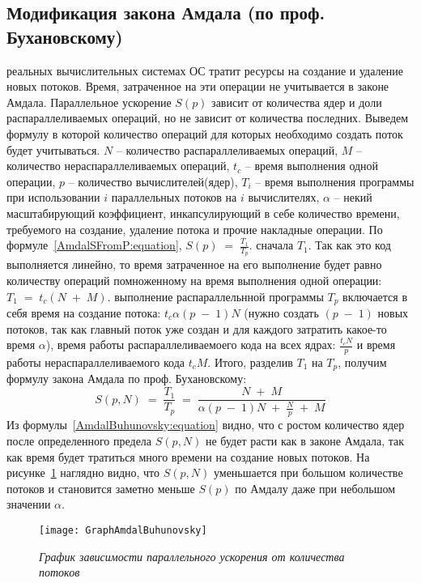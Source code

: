 { %
	\subsection{Модификация закона Амдала (по проф. Бухановскому)}
	 реальных вычислительных системах ОС тратит ресурсы на создание и удаление новых потоков. Время, затраченное на эти операции не учитывается в законе Амдала. Параллельное ускорение $S(p)$ зависит от количества ядер и доли распараллеливаемых операций, но не зависит от количества последних. Выведем формулу в которой количество операций для которых необходимо создать поток будет учитываться.
	 $N$ – количество распараллеливаемых операций, $M$ – количество нераспараллеливаемых операций, $t_c$ – время выполнения одной операции, $p$ – количество вычислителей(ядер), $T_i$ – время выполнения программы при использовании $i$ параллельных потоков на $i$ вычислителях, $\alpha$ – некий масштабирующий коэффициент, инкапсулирующий в себе количество времени, требуемого на создание, удаление потока и прочие накладные операции. 
По формуле~\eqref{AmdalSFromP:equation}, $S(p)\;=\;\frac{T_1}{T_p}$.
	 сначала $T_1$. Так как это код выполняется линейно, то время затраченное на его выполнение будет равно количеству операций помноженному на время выполнения одной операции: $T_1\;=\;t_c(N\;+\;M)$. 
	 выполнение распараллельнной программы $T_p$ включается в себя время на создание потока: $t_c\alpha(p\;-\;1)N$ (нужно создать $(p\;-\;1)$ новых потоков, так как главный поток уже создан и для каждого затратить какое-то время $\alpha$), время работы распараллеливаемоего кода на всех ядрах: $\frac {t_cN}p$ и время работы нераспараллеливаемого кода $t_cM$. Итого, разделив $T_1$ на $T_p$, получим формулу закона Амдала по проф. Бухановскому:
	\begin{equation}
		\label{AmdalBuhunovsky:equation}
		S(p,N)\;=\;\frac{T_1}{T_p}\;=\;\frac{N\;+\;M}{\alpha(p\;-\;1)N\;+\;\frac Np\;+\;M}
	\end{equation}
	Из формулы~\eqref{AmdalBuhunovsky:equation} видно, что с ростом количество ядер после определенного предела $S(p,N)$  не будет расти как в законе Амдала, так как время будет тратиться много времени на создание новых потоков. На рисунке~\ref{GraphAmdalBuhunovsky:image} наглядно видно, что $S(p,N)$ уменьшается при большом количестве потоков и становится заметно меньше $S(p)$ по Амдалу даже при небольшом значении $\alpha$.
	\begin{figure}[H]
		\texttt{[image: GraphAmdalBuhunovsky]}
		\caption{\textit{График зависимости параллельного ускорения от количества потоков}}
		\label{GraphAmdalBuhunovsky:image}
	\end{figure}
}